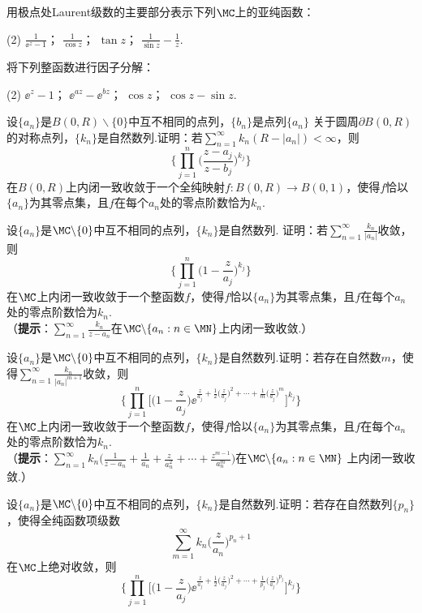 \begin{xiti}
\item 用极点处Laurent级数的主要部分表示下列$\MC$上的亚纯函数：
\begin{tasks}(2)
\task $\frac1{\ee^z-1}$；
\task $\frac1{\cos z}$；
\task $\tan z$；
\task $\frac1{\sin z}-\frac1z$.
\end{tasks}
\item 将下列整函数进行因子分解：
\begin{tasks}(2)
\task $\ee^z-1$；
\task $\ee^{az}-\ee^{bz}$；
\task $\cos z$；
\task $\cos z-\sin z$.
\end{tasks}
\item 设$\{a_n\}$是$B(0,R)\backslash\{0\}$中互不相同的点列，$\{b_n\}$是点列$\{a_n\}$
关于圆周$\partial B(0,R)$的对称点列，$\{k_n\}$是自然数列.证明：若$\sum_{n=1}^\infty k_n(R-|a_n|)<\infty$，则
\[\bigg\{\prod_{j=1}^n\bigg(\frac{z-a_j}{z-b_j}\bigg)^{k_j}\bigg\}\]
在$B(0,R)$上内闭一致收敛于一个全纯映射$f:B(0,R)\to B(0,1)$，使得$f$恰以$\{a_n\}$为其零点集，且$f$在每个$a_n$处的零点阶数恰为$k_n$.
\item 设$\{a_n\}$是$\MC\backslash\{0\}$中互不相同的点列，$\{k_n\}$是自然数列. 证明：若$\sum_{n=1}^\infty\frac{k_n}{|a_n|}$收敛，则
    \[\bigg\{\prod_{j=1}^n\bigg(1-\frac z{a_j}\bigg)^{k_j}\bigg\}\]
在$\MC$上内闭一致收敛于一个整函数$f$，使得$f$恰以$\{a_n\}$为其零点集，且$f$在每个$a_n$处的零点阶数恰为$k_n$.\\
（\textbf{提示}：$\sum_{n=1}^\infty\frac{k_n}{z-a_n}$在$\MC\backslash\{a_n:n\in\MN\}$上内闭一致收敛.）
\item 设$\{a_n\}$是$\MC\backslash\{0\}$中互不相同的点列，$\{k_n\}$是自然数列.证明：若存在自然数$m$，使得$\sum_{n=1}^\infty\frac{k_n}{|a_n|^{m+1}}$收敛，则
\[\bigg\{\prod_{j=1}^n\bigg[\bigg(1-\frac z{a_j}\bigg)\ee^{\frac z{a_j}+\frac12\big(\frac z{a_j}\big)^2+\cdots+\frac1m\big(\frac z{a_j}\big)^m}\bigg]^{k_j}\bigg\}\]
在$\MC$上内闭一致收敛于一个整函数$f$，使得$f$恰以$\{a_n\}$为其零点集，且$f$在每个$a_n$处的零点阶数恰为$k_n$.\\
（\textbf{提示}：$\sum_{n=1}^\infty k_n\bigg(\frac1{z-a_n}+\frac1{a_n}
+\frac z{a_n^2}+\cdots+\frac{z^{m-1}}{a_n^m}\bigg)$在$\MC\backslash\{a_n:n\in\MN\}$
上内闭一致收敛.）
\item 设$\{a_n\}$是$\MC\backslash\{0\}$中互不相同的点列，$\{k_n\}$是自然数列.证明：若存在自然数列$\{p_n\}$，使得全纯函数项级数
    \[\sum_{m=1}^\infty k_n\bigg(\frac z{a_n}\bigg)^{p_n+1}\]
在$\MC$上绝对收敛，则
\[\bigg\{\prod_{j=1}^n\bigg[\bigg(1-\frac z{a_j}\bigg)\ee^{\frac z{a_j}+\frac12\big(\frac z{a_j}\big)^2+\cdots+\frac1{p_j}\big(\frac z{a_j}\big)^{p_j}}\bigg]^{k_j}\bigg\}\]

\end{xiti}
